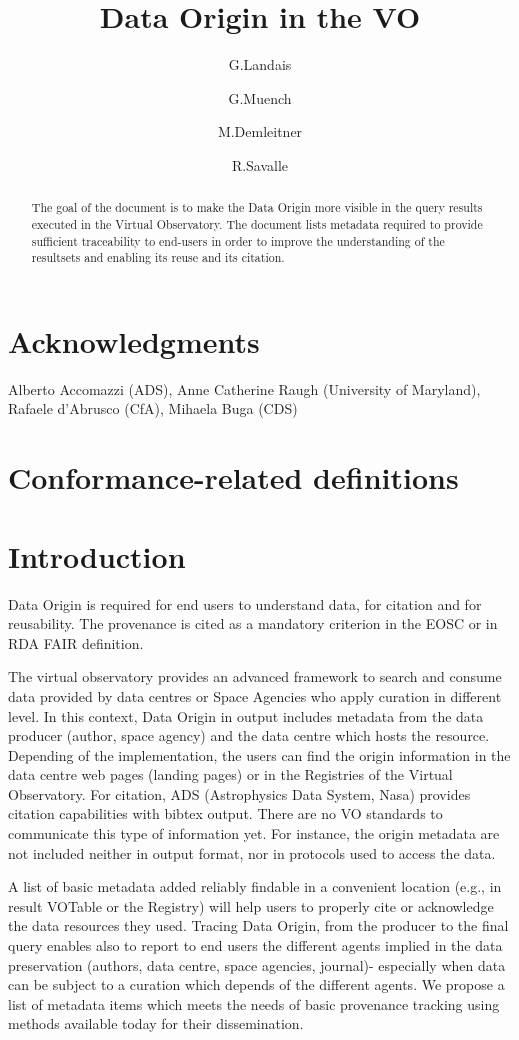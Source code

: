 \documentclass[11pt,a4paper]{ivoa}
\title{Data Origin in the VO}
\author{G.Landais}
\author{G.Muench}
\author{M.Demleitner}
\author{R.Savalle}
\begin{document}
\begin{abstract}
The goal of the document is to make the Data Origin more visible in the query results executed in the Virtual Observatory.
The document lists metadata required to provide sufficient traceability to end-users in order to improve the understanding
of the resultsets and enabling its reuse and its citation.



\end{abstract}


\section*{Acknowledgments}
Alberto Accomazzi (ADS), Anne Catherine Raugh (University of Maryland), Rafaele d'Abrusco (CfA), Mihaela Buga (CDS)

\section*{Conformance-related definitions}


\section{Introduction}

Data Origin is required for end users to understand data, for citation and for reusability. The  provenance is cited as a mandatory criterion in the EOSC or in RDA FAIR definition.

The virtual observatory provides an advanced framework to search and consume data provided by data centres or Space Agencies who apply curation in different level.  In this context, Data Origin in output includes metadata from the data producer (author, space agency) and the data centre which hosts the resource.
Depending of the implementation, the users can find the origin information in the data centre web pages (landing pages) or in the Registries of the Virtual Observatory. For citation, ADS (Astrophysics Data System, Nasa) provides citation capabilities with bibtex output. There are no VO standards to communicate this type of information yet. For instance, the origin metadata are not included neither in output format, nor in protocols used to access the data.

A list of basic metadata added reliably findable in a convenient location (e.g.,
in result VOTable or the Registry) will help users to properly cite or
acknowledge the data resources they used.
Tracing Data Origin, from the producer to the final query enables also to report to end users the different agents implied in the data preservation (authors, data centre, space agencies, journal)- especially when data can be subject to a curation  which depends of the different agents.
We propose a list of metadata items which meets the needs of basic provenance
tracking using methods available today for their dissemination.
\end{document}
